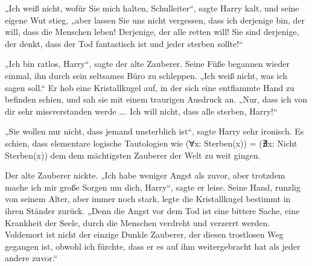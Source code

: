 „Ich weiß nicht, wofür Sie mich halten, Schulleiter“, sagte Harry kalt, und seine eigene Wut stieg, „aber lassen Sie uns nicht vergessen, dass ich derjenige bin, der will, dass die Menschen leben! Derjenige, der alle retten will! Sie sind derjenige, der denkt, dass der Tod fantastisch ist und jeder sterben sollte!“

„Ich bin ratlos, Harry“, sagte der alte Zauberer. Seine Füße begannen wieder einmal, ihn durch sein seltsames Büro zu schleppen.
„Ich weiß nicht, was ich sagen soll.“ Er hob eine Kristallkugel auf, in der sich eine entflammte Hand zu befinden schien, und sah sie mit einem traurigen Ausdruck an.
„Nur, dass ich von dir sehr missverstanden werde …. Ich will nicht, dass alle sterben, Harry!“

„Sie wollen nur nicht, dass jemand unsterblich ist“, sagte Harry sehr ironisch. Es schien, dass elementare logische Tautologien wie (Ɐx: Sterben(x)) = (∄x: Nicht Sterben(x)) dem dem mächtigsten Zauberer der Welt zu weit gingen.%

Der alte Zauberer nickte.
„Ich habe weniger Angst als zuvor, aber trotzdem mache ich mir große Sorgen um dich, Harry“, sagte er leise. Seine Hand, runzlig von seinem Alter, aber immer noch stark, legte die Kristallkugel bestimmt in ihren Ständer zurück.
„Denn die Angst vor dem Tod ist eine bittere Sache, eine Krankheit der Seele, durch die Menschen verdreht und verzerrt werden. Voldemort ist nicht der einzige Dunkle Zauberer, der diesen trostlosen Weg gegangen ist, obwohl ich fürchte, dass er es auf ihm weitergebracht hat als jeder andere zuvor.“

